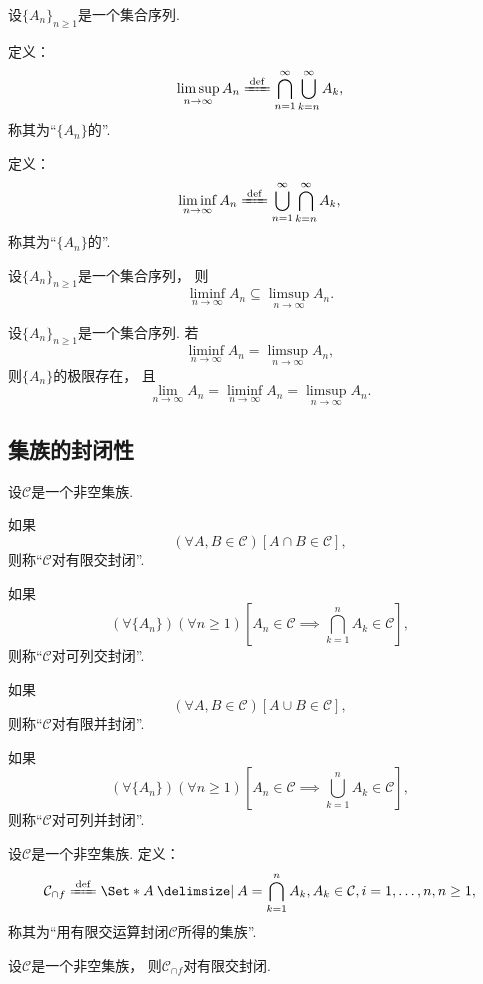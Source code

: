 \begin{definition}
设\(\{A_n\}_{n\geq1}\)是一个集合序列.

定义：\[
	\limsup_{n\to\infty} A_n
	\defeq
	\bigcap_{n=1}^\infty
	\bigcup_{k=n}^\infty
	A_k,
\]
称其为“\(\{A_n\}\)的”.

定义：\[
	\liminf_{n\to\infty} A_n
	\defeq
	\bigcup_{n=1}^\infty
	\bigcap_{k=n}^\infty
	A_k,
\]
称其为“\(\{A_n\}\)的”.
\end{definition}

\begin{proposition}
设\(\{A_n\}_{n\geq1}\)是一个集合序列，
则\begin{equation}
	\liminf_{n\to\infty} A_n
	\subseteq
	\limsup_{n\to\infty} A_n.
\end{equation}
\end{proposition}

\begin{proposition}
设\(\{A_n\}_{n\geq1}\)是一个集合序列.
若\[
	\liminf_{n\to\infty} A_n
	= \limsup_{n\to\infty} A_n,
\]
则\(\{A_n\}\)的极限存在，
且\[
	\lim_{n\to\infty} A_n
	= \liminf_{n\to\infty} A_n
	= \limsup_{n\to\infty} A_n.
\]
\end{proposition}

\subsection{集族的封闭性}
\begin{definition}[集族的封闭性]
设\(\mathcal{C}\)是一个非空集族.

如果\[
	(\forall A,B\in\mathcal{C})
	[A \cap B \in \mathcal{C}],
\]
则称“\(\mathcal{C}\)对有限交封闭”.

如果\[
	(\forall \{A_n\})
	(\forall n\geq1)
	\left[A_n\in\mathcal{C} \implies \bigcap_{k=1}^n A_k \in \mathcal{C}\right],
\]
则称“\(\mathcal{C}\)对可列交封闭”.

如果\[
	(\forall A,B\in\mathcal{C})
	[A \cup B \in \mathcal{C}],
\]
则称“\(\mathcal{C}\)对有限并封闭”.

如果\[
	(\forall \{A_n\})
	(\forall n\geq1)
	\left[A_n\in\mathcal{C} \implies \bigcup_{k=1}^n A_k \in \mathcal{C}\right],
\]
则称“\(\mathcal{C}\)对可列并封闭”.
\end{definition}

\begin{definition}
设\(\mathcal{C}\)是一个非空集族.
定义：\[
	\mathcal{C}_{\cap f}
	\defeq
	\Set*{
		A \given
		A = \bigcap_{k=1}^n A_k,
		A_k \in \mathcal{C}, i=1,\dotsc,n,
		n\geq1
	},
\]
称其为“用有限交运算封闭\(\mathcal{C}\)所得的集族”.
\end{definition}

\begin{proposition}
设\(\mathcal{C}\)是一个非空集族，
则\(\mathcal{C}_{\cap f}\)对有限交封闭.
\end{proposition}

